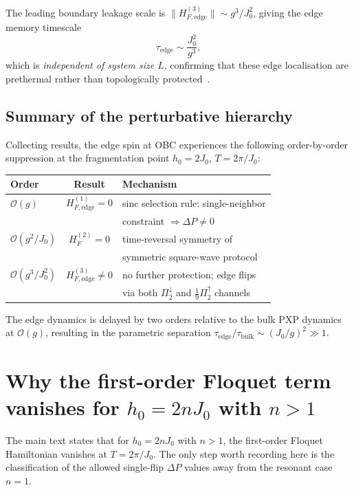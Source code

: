 \documentclass[aps,prb,reprint,twocolumn,amsmath,amssymb,citeautoscript]{revtex4-2}
\begin{document}
The leading boundary leakage scale is
$\|H_{F,\mathrm{edge}}^{(3)}\|\sim g^3/J_0^2$, giving the
edge memory timescale
\begin{equation}
\tau_{\mathrm{edge}}\sim\frac{J_0^2}{g^3},
\label{eq:app:edge_tau}
\end{equation}
which is \textit{independent of system size $L$}, confirming that
these edge localisation are prethermal rather than topologically
protected~\cite{ElseFendleyKempNayak2017PRX}.


\subsection{Summary of the perturbative hierarchy}
\label{app:edge:summary}

Collecting results, the edge spin at OBC experiences the following
order-by-order suppression at the fragmentation point
$h_0=2J_0$, $T=2\pi/J_0$:

\begin{center}
\begin{tabular}{lcl}
\textbf{Order} & \textbf{Result} & \textbf{Mechanism} \\
\hline
$\mathcal{O}(g)$
& $H_{F,\mathrm{edge}}^{(1)}=0$
& sinc selection rule: single-neighbor\\
& & constraint $\Rightarrow\Delta P\ne 0$ \\[3pt]
$\mathcal{O}(g^2/J_0)$
& $H_{F}^{(2)}=0$
& time-reversal symmetry of \\
& & symmetric square-wave protocol \\[3pt]
$\mathcal{O}(g^3/J_0^2)$
& $H_{F,\mathrm{edge}}^{(3)}\ne 0$
& no further protection; edge flips \\
& & via both $\Pi_2^{\downarrow}$ and
$\frac{1}{9}\Pi_2^{\uparrow}$ channels
\end{tabular}
\end{center}
\noindent
The edge dynamics is delayed by two orders relative to the bulk
PXP dynamics at $\mathcal{O}(g)$, resulting in the parametric
separation
$\tau_{\mathrm{edge}}/\tau_{\mathrm{bulk}}\sim (J_0/g)^2\gg 1$.

\section{Why the first-order Floquet term vanishes for $h_0=2nJ_0$ with $n>1$}
\label{app:freezing}

The main text states that for $h_0=2nJ_0$ with $n>1$, the first-order
Floquet Hamiltonian vanishes at $T=2\pi/J_0$. The only step worth
recording here is the classification of the allowed single-flip
$\Delta P$ values away from the resonant case $n=1$.
\end{document}
